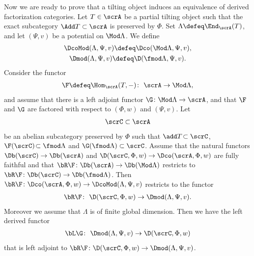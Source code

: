 Now we are ready to prove that a tilting object induces an equivalence of derived factorization categories. Let $T\in \scrA$ be a partial tilting object such that the exact subcategory $\Add T\subset \scrA$ is preserved by $\Phi$. Set $\Lambda\defeq\End_{\scrA}(T)$, and
 let $(\Psi,v)$ be a potential on $\Mod\Lambda$. We define
 \begin{gather*}
 \DcoMod(\Lambda,\Psi,v)\defeq\Dco(\Mod\Lambda,\Psi,v),
 \\
 \Dmod(\Lambda,\Psi,v)\defeq\D(\fmod\Lambda,\Psi,v).
 \end{gather*}
Consider the functor
 \begin{gather*}
 \F\defeq\Hom_{\scrA}(T,-)\colon\ \scrA\to \Mod\Lambda,
 \end{gather*}
 and assume that there is a left adjoint functor $\G\colon \Mod\Lambda\to \scrA$, and that $\F$ and $\G$ are factored with respect to $(\Phi,w)$ and $(\Psi,v)$. Let
 \begin{gather*}
 \scrC\subset \scrA
 \end{gather*}
 be an abelian subcategory preserved by $\Phi$ such that $\add T\!\subset \scrC$, $\F(\scrC)\!\subset \fmod\Lambda$ and \mbox{$\G(\fmod\Lambda)\subset \scrC$}. Assume that the natural functors $\Db(\scrC)\to\Db(\scrA)$ and $\D(\scrC,\Phi,w)\to \Dco(\scrA,\Phi,w)$ are fully faithful and that $\bR \F\colon\Db(\scrA)\to\Db(\Mod\Lambda)$ restricts to $\bR \F\colon\Db(\scrC)\to\Db(\fmod\Lambda)$. Then $\bR \F\colon\Dco(\scrA,\Phi,w)\to \DcoMod(\Lambda,\Psi,v)$ restricts to the functor
\begin{gather*}
\bR \F\colon\ \D(\scrC,\Phi,w)\to \Dmod(\Lambda,\Psi,v).
\end{gather*}
Moreover we assume that $\Lambda$ is of finite global dimension. Then we have the left derived functor
\begin{gather*}
\bL\G\colon\ \Dmod(\Lambda,\Psi,v)\to \D(\scrC,\Phi,w)
\end{gather*}
that is left adjoint to $\bR\F\colon\D(\scrC,\Phi,w)\to \Dmod(\Lambda,\Psi,v)$.
